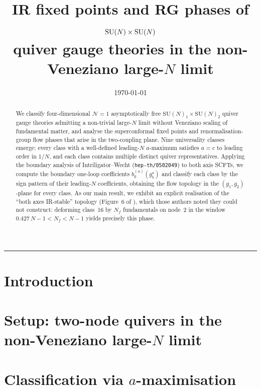 \documentclass[11pt,a4paper]{article}
\title{\bfseries IR fixed points and RG phases of $\SU(N)\times\SU(N)$\\
  quiver gauge theories in the non-Veneziano large-$N$ limit}
\author{%
}
\date{\today}
\newcommand{\N}{\mathcal{N}}
\newcommand{\SU}{\mathrm{SU}}
\newcommand{\Nf}{N_{\!f}}
\begin{document}
\maketitle

\begin{abstract}
\noindent
We classify four-dimensional $\N=1$ asymptotically free
$\SU(N)_{1}\times\SU(N)_{2}$ quiver gauge theories admitting a
non-trivial large-$N$ limit without Veneziano scaling of fundamental
matter, and analyse the superconformal fixed points and
renormalisation-group flow phases that arise in the two-coupling
plane.  Nine universality classes emerge; every class with a
well-defined leading-$N$ $a$-maximum satisfies $a=c$ to leading order
in $1/N$, and each class contains multiple distinct quiver
representatives.  Applying the boundary analysis of
Intriligator--Wecht (\texttt{hep-th/0502049}) to both axis SCFTs, we
compute the boundary one-loop coefficients
$b_{0}^{(a)}(g_{b}^{\star})$ and classify each class by the sign
pattern of their leading-$N$ coefficients, obtaining the flow
topology in the $(g_{1},g_{2})$-plane for every class.  As our main
result, we exhibit an explicit realisation of the
``both axes IR-stable'' topology (Figure~6 of \cite{IW2005}), which
those authors noted they could not construct: deforming class~16 by
$\Nf$ fundamentals on node~2 in the window
$0.427\,N-1<\Nf<N-1$ yields precisely this phase.
\end{abstract}

\tableofcontents
\bigskip
\hrule
\bigskip

\section{Introduction}
\label{sec:intro}



\section{Setup: two-node quivers in the non-Veneziano large-$N$ limit}
\label{sec:setup}



\section{Classification via \texorpdfstring{$a$}{a}-maximisation}
\label{sec:classification}
\end{document}
